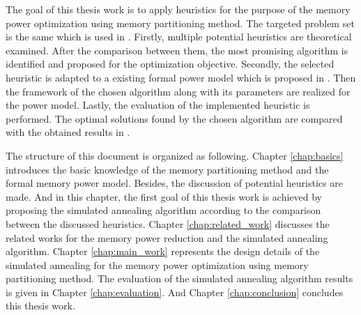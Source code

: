 	The goal of this thesis work is to apply heuristics for the purpose of the memory power optimization using memory partitioning method.
	The targeted problem set is the same which is used in \cite{Strobel2016}.
	Firstly, multiple potential heuristics are theoretical examined. After the comparison between them, the most promising algorithm is identified and proposed for the optimization objective.
	Secondly, the selected heuristic is adapted to a existing formal power model which is proposed in \cite{Strobel2016}.
	Then the framework of the chosen algorithm along with its parameters are realized for the power model.
	Lastly, the evaluation of the implemented heuristic is performed. The optimal solutions found by the chosen algorithm are compared with the
	obtained results in \cite{Strobel2016}.
	
	The structure of this document is organized as following.
	Chapter \ref{chap:basics} introduces the basic knowledge of the memory partitioning method and the formal memory power model.
	Besides, the discussion of potential heuristics are made. And in this chapter, the first goal of this thesis work is achieved by proposing
	the simulated annealing algorithm according to the comparison between the discussed heuristics.
	Chapter \ref{chap:related_work} discusses the related works for the memory power reduction and the simulated annealing algorithm.
	Chapter \ref{chap:main_work} represents the design details of the simulated annealing for the memory power optimization using memory partitioning method.
	The evaluation of the simulated annealing algorithm results is given in Chapter \ref{chap:evaluation}.
	And Chapter \ref{chap:conclusion} concludes this thesis work.	


